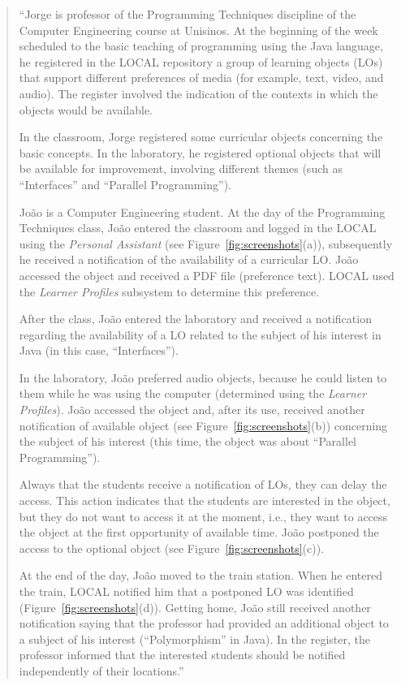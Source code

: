 \documentclass[5p,authoryear]{elsarticle}
\begin{document}
\begin{quotation}
``Jorge is professor of the Programming Techniques discipline of the Computer
Engineering course at Unisinos. At the beginning of the week scheduled to the
basic teaching of programming using the Java language, he registered in the
LOCAL repository a group of learning objects (LOs) that support different
preferences of media (for example, text, video, and audio). The register
involved the indication of the contexts in which the objects would be
available.

In the classroom, Jorge registered some curricular objects concerning the basic
concepts. In the laboratory, he registered optional objects that will be
available for improvement, involving different themes (such as ``Interfaces''
and ``Parallel Programming''). 

João is a Computer Engineering student. At the day of the Programming
Techniques class, João entered the classroom and logged in the LOCAL using the
\emph{Personal Assistant} (see Figure~\ref{fig:screenshots}(a)), subsequently
he received a notification of the availability of a curricular LO. João
accessed the object and received a PDF file (preference text). LOCAL used the
\emph{Learner Profiles} subsystem to determine this preference. 

After the class, João entered the laboratory and received a notification
regarding the availability of a LO related to the subject of his interest in
Java (in this case, ``Interfaces''). 

In the laboratory, João preferred audio objects, because he could listen to
them while he was using the computer (determined using the \emph{Learner
Profiles}).  João accessed the object and, after its use, received another
notification of available object (see Figure~\ref{fig:screenshots}(b))
concerning the subject of his interest (this time, the object was about
``Parallel Programming'').

Always that the students receive a notification of LOs, they can delay the
access. This action indicates that the students are interested in the object,
but they do not want to access it at the moment, i.e., they want to access the
object at the first opportunity of available time. João postponed the access to
the optional object (see Figure~\ref{fig:screenshots}(c)).

At the end of the day, João moved to the train station. When he entered the
train, LOCAL notified him that a postponed LO was identified
(Figure~\ref{fig:screenshots}(d)).  Getting home, João still received another
notification saying that the professor had provided an additional object to a
subject of his interest (``Polymorphism'' in Java). In the register, the
professor informed that the interested students should be notified
independently of their locations.'' \end{quotation}
\end{document}
